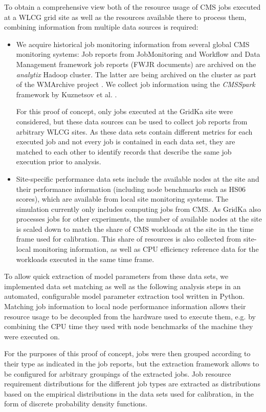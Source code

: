 \documentclass{webofc}
\begin{document}
To obtain a comprehensive view both of the resource usage of CMS jobs executed at a WLCG grid site as well as the resources available there to process them, combining information from multiple data sources is required:
\begin{itemize}
    \item We acquire historical job monitoring information from several global CMS monitoring systems: Job reports from JobMonitoring and Workflow and Data Management framework job reports (FWJR documents) are archived on the \emph{analytix} Hadoop cluster.
    The latter are being archived on the cluster as part of the WMArchive project \cite{WMArchiveWorkloadArchive2018}.
    We collect job information using the \emph{CMSSpark} framework by Kuznetsov et al. \cite{cmsspark}.

    For this proof of concept, only jobs executed at the GridKa site were considered, but these data sources can be used to collect job reports from arbitrary WLCG sites.
    As these data sets contain different metrics for each executed job and not every job is contained in each data set, they are matched to each other to identify records that describe the same job execution prior to analysis.
    \item Site-specific performance data sets include the available nodes at the site and their performance information (including node benchmarks such as HS06 scores), which are available from local site monitoring systems.
    The simulation currently only includes computing jobs from CMS.
    As GridKa also processes jobs for other experiments, the number of available nodes at the site is scaled down to match the share of CMS workloads at the site in the time frame used for calibration.
    This share of resources is also collected from site-local monitoring information, as well as CPU efficiency reference data for the workloads executed in the same time frame.
\end{itemize}
To allow quick extraction of model parameters from these data sets, we implemented data set matching as well as the following analysis steps in an automated, configurable model parameter extraction tool written in Python.
Matching job information to local node performance information allows their resource usage to be decoupled from the hardware used to execute them, e.g. by combining the CPU time they used with node benchmarks of the machine they were executed on.

For the purposes of this proof of concept, jobs were then grouped according to their type as indicated in the job reports, but the extraction framework allows to be configured for arbitrary groupings of the extracted jobs.
Job resource requirement distributions for the different job types are extracted as distributions based on the empirical distributions in the data sets used for calibration, in the form of discrete probability density functions.
\end{document}
